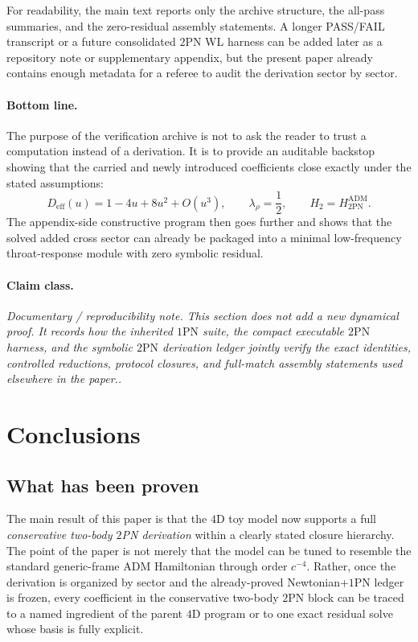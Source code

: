 \documentclass[11pt]{article}
\newcommand{\OnePN}{\mathrm{1PN}}
\newcommand{\TwoPN}{\mathrm{2PN}}
\newcommand{\ADM}{\mathrm{ADM}}
\newcommand{\eff}{\mathrm{eff}}
\newcommand{\claimclass}[1]{\paragraph{Claim class.}\emph{#1.}}
\begin{document}
For readability, the main text reports only the archive structure, the all-pass summaries,
and the zero-residual assembly statements.
A longer PASS/FAIL transcript or a future consolidated \(\TwoPN\) WL harness can be added
later as a repository note or supplementary appendix, but the present paper already
contains enough metadata for a referee to audit the derivation sector by sector.

\paragraph{Bottom line.}
The purpose of the verification archive is not to ask the reader to trust a computation
instead of a derivation.
It is to provide an auditable backstop showing that the carried and newly introduced
coefficients close exactly under the stated assumptions:
\begin{equation}
D_{\eff}(u)=1-4u+8u^2+O(u^3),
\qquad
\lambda_\rho=\frac12,
\qquad
H_2=H^{\ADM}_{2\mathrm{PN}}.
\label{eq:verification-bottom-line-2pn}
\end{equation}
The appendix-side constructive program then goes further and shows that the solved added
cross sector can already be packaged into a minimal low-frequency throat-response module
with zero symbolic residual.

\claimclass{Documentary / reproducibility note.  This section does not add a new dynamical
proof.  It records how the inherited \(\OnePN\) suite, the compact executable \(\TwoPN\)
harness, and the symbolic \(\TwoPN\) derivation ledger jointly verify the exact
identities, controlled reductions, protocol closures, and full-match assembly statements
used elsewhere in the paper.}

\section{Conclusions}
\label{sec:conclusion}

\subsection{What has been proven}
\label{sec:conclusion-proven}

The main result of this paper is that the \(4\)D toy model now supports a full
\emph{conservative two-body \(2\)PN derivation} within a clearly stated closure
hierarchy.
The point of the paper is not merely that the model can be tuned to resemble the
standard generic-frame \(\ADM\) Hamiltonian through order \(c^{-4}\).
Rather, once the derivation is organized by sector and the already-proved
Newtonian+\(\OnePN\) ledger is frozen, every coefficient in the conservative
two-body \(\TwoPN\) block can be traced to a named ingredient of the parent
\(4\)D program or to one exact residual solve whose basis is fully explicit.
\end{document}
